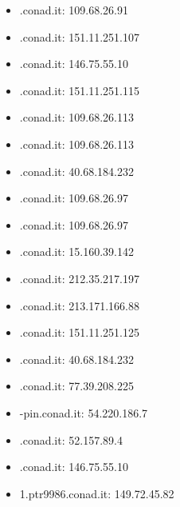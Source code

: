 \documentclass{article}
\begin{document}
\begin{itemize}
        \item \textbfeditor.conad.it: 109.68.26.91
    
        \item \textbffileuploader.conad.it: 151.11.251.107
    
        \item \textbffuturo.conad.it: 146.75.55.10
    
        \item \textbfgepamweb.conad.it: 151.11.251.115
    
        \item \textbfguidasocial.conad.it: 109.68.26.113
    
        \item \textbfguidasocialspazio.conad.it: 109.68.26.113
    
        \item \textbfgustourevinci.conad.it: 40.68.184.232
    
        \item \textbfilgrandeviaggio.conad.it: 109.68.26.97
    
        \item \textbfilgrandeviaggioinsieme.conad.it: 109.68.26.97
    
        \item \textbfilsaporedelleemozioni.conad.it: 15.160.39.142
    
        \item \textbfinostriori.conad.it: 212.35.217.197
    
        \item \textbfinsiemeperlascuola.conad.it: 213.171.166.88
    
        \item \textbfiungo.conad.it: 151.11.251.125
    
        \item \textbflacasadeisogni.conad.it: 40.68.184.232
    
        \item \textbfmaestrideltaglio.conad.it: 77.39.208.225
    
        \item \textbfmipremio-pin.conad.it: 54.220.186.7
    
        \item \textbfmipremio.conad.it: 52.157.89.4
    
        \item \textbfmy.conad.it: 146.75.55.10
    
        \item \textbfo1.ptr9986.conad.it: 149.72.45.82
    

\end{itemize}
\end{document}
